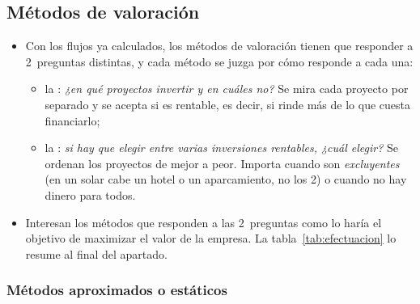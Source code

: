\documentclass[11pt]{article}
\begin{document}
\subsection{Métodos de valoración}\label{sec:metodos}

\begin{itemize}
\item Con los flujos ya calculados, los métodos de valoración tienen que responder a 2~preguntas distintas, y cada método se juzga por cómo responde a cada una:
  \begin{itemize}
  \item la : \emph{¿en qué proyectos invertir y en cuáles no?} Se mira cada proyecto por separado y se acepta si es rentable, es decir, si rinde más de lo que cuesta financiarlo;
  \item la : \emph{si hay que elegir entre varias inversiones rentables, ¿cuál elegir?} Se ordenan los proyectos de mejor a peor. Importa cuando son \emph{excluyentes} (en un solar cabe un hotel o un aparcamiento, no los 2) o cuando no hay dinero para todos.
  \end{itemize}
\item Interesan los métodos que responden a las 2~preguntas como lo haría el objetivo de maximizar el valor de la empresa. La tabla~\ref{tab:efectuacion} lo resume al final del apartado.
\end{itemize}

\subsubsection{Métodos aproximados o estáticos}\label{sec:estaticos}
\end{document}

